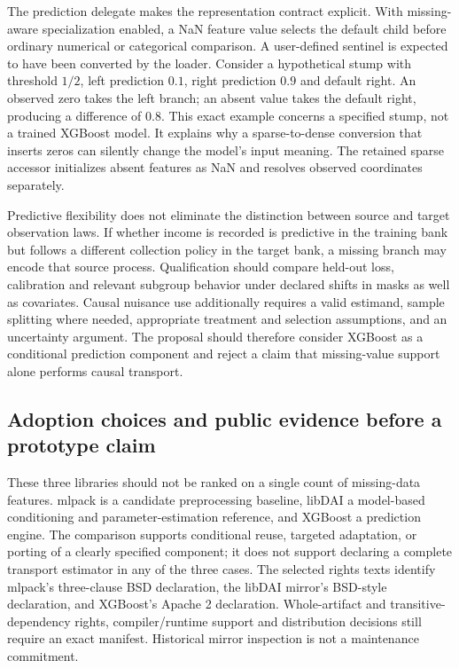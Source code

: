 The prediction delegate makes the representation contract explicit. With missing-aware specialization enabled, a NaN feature value selects the default child before ordinary numerical or categorical comparison. A user-defined sentinel is expected to have been converted by the loader. Consider a hypothetical stump with threshold $1/2$, left prediction $0.1$, right prediction $0.9$ and default right. An observed zero takes the left branch; an absent value takes the default right, producing a difference of $0.8$. This exact example concerns a specified stump, not a trained XGBoost model. It explains why a sparse-to-dense conversion that inserts zeros can silently change the model's input meaning. The retained sparse accessor initializes absent features as NaN and resolves observed coordinates separately.~\citep{exec25_ctm_xgboost,exec25_ctm_choice}

Predictive flexibility does not eliminate the distinction between source and target observation laws. If whether income is recorded is predictive in the training bank but follows a different collection policy in the target bank, a missing branch may encode that source process. Qualification should compare held-out loss, calibration and relevant subgroup behavior under declared shifts in masks as well as covariates. Causal nuisance use additionally requires a valid estimand, sample splitting where needed, appropriate treatment and selection assumptions, and an uncertainty argument. The proposal should therefore consider XGBoost as a conditional prediction component and reject a claim that missing-value support alone performs causal transport.~\citep{exec25_ctm_choice}

\subsection*{Adoption choices and public evidence before a prototype claim}
These three libraries should not be ranked on a single count of missing-data features. mlpack is a candidate preprocessing baseline, libDAI a model-based conditioning and parameter-estimation reference, and XGBoost a prediction engine. The comparison supports conditional reuse, targeted adaptation, or porting of a clearly specified component; it does not support declaring a complete transport estimator in any of the three cases. The selected rights texts identify mlpack's three-clause BSD declaration, the libDAI mirror's BSD-style declaration, and XGBoost's Apache 2 declaration. Whole-artifact and transitive-dependency rights, compiler/runtime support and distribution decisions still require an exact manifest. Historical mirror inspection is not a maintenance commitment.~\citep{exec25_ctm_mlpack,exec25_ctm_libdai,exec25_ctm_xgboost,exec25_ctm_choice}


